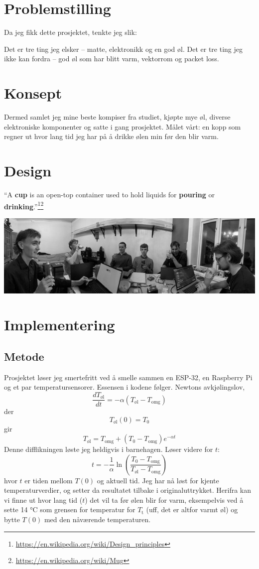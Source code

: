 \documentclass{article}
\begin{document}
\section{Problemstilling}
Da jeg fikk dette prosjektet, tenkte jeg slik:

Det er tre ting jeg elsker – matte, elektronikk og en god øl.  
Det er tre ting jeg ikke kan fordra – god øl som har blitt varm, vektorrom og packet loss.

\section{Konsept}
Dermed samlet jeg mine beste kompiser fra studiet, kjøpte mye øl, diverse elektroniske komponenter og satte i gang prosjektet.  
Målet vårt: en kopp som regner ut hvor lang tid jeg har på å drikke ølen min før den blir varm.

\section{Design}
``A \textbf{cup} is an open-top container used to hold liquids for \textbf{pouring} or \textbf{drinking}.''\footnote{\url{https://en.wikipedia.org/wiki/Design_principles}}\footnote{\url{https://en.wikipedia.org/wiki/Mug}}
\vfill
\begin{center}
    \includegraphics[width=\textwidth]{Panorama_pilsing.jpg}
\end{center}
\newpage
\section{Implementering}
\subsection{Metode}
Prosjektet løser jeg smertefritt ved å smelle sammen en ESP-32, en Raspberry Pi og et par temperatursensorer. Essensen i kodene følger.
Newtons avkjølingslov,
\[ 
\frac{dT_{\text{øl}}}{dt} = -\alpha(T_{\text{øl}} - T_{\text{omg}})
\]
der
\[ 
T_{\text{øl}}(0) = T_{0}
\]
gir
\[ 
T_{\text{øl}} = T_{\text{omg}} + (T_{0} - T_{\text{omg}})e^{-\alpha t}
\]
Denne difflikningen løste jeg heldigvis i barnehagen.
Løser videre for \(t\):
\[ 
t = -\frac{1}{\alpha} \ln \left(\frac{T_{0} - T_{\text{omg}}}{T_{\text{øl}} - T_{\text{omg}}}\right)
\]
hvor \(t\) er tiden mellom \(T(0)\) og aktuell tid. Jeg har nå løst for kjente temperaturverdier, og setter da resultatet tilbake i originaluttrykket. Herifra kan vi finne ut hvor lang tid (\(t\)) det vil ta før ølen blir for varm, eksempelvis ved å sette 14 °C som grensen for temperatur for \(T_{\text{t}}\) (uff, det er altfor varmt øl) og bytte \(T(0)\) med den nåværende temperaturen.\\
\end{document}
